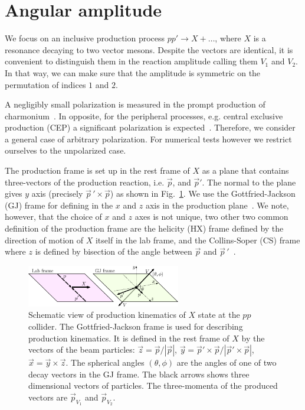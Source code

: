 \documentclass[prd,preprintnumbers,floatfix,
nofootinbib,superscriptaddress]{revtex4}
\begin{document}
\section{Angular amplitude} \label{sec:reaction.amplitude}
We focus on an inclusive production process $p p'\to X + \dots$, where $X$ is a resonance decaying to two vector mesons.
Despite the vectors are identical, it is convenient to distinguish them in the reaction amplitude calling them $V_1$ and $V_2$.
In that way, we can make sure that the amplitude is symmetric on the permutation of indices $1$ and $2$.

A negligibly small polarization is measured in the prompt production of charmonium~\cite{Aaij:2013nlm,Chatrchyan:2012woa,CDF:2011ag, Aaij:2013oxa,Sirunyan:2018bfd}.
In opposite, for the peripheral processes, e.g. central exclusive production (CEP) a significant polarization is expected~\cite{Pasechnik:2010pq}.
Therefore, we consider a general case of arbitrary polarization. For numerical tests however we restrict ourselves to the unpolarized case.

The production frame is set up in the rest frame of $X$ as a plane that contains three-vectors of the
production reaction, i.e. $\vec p$, and $\vec p'$. The normal to the plane gives $y$ axis (precisely $\vec p\,'\times \vec p$) as shown in Fig.~\ref{fig:production}.
We use the Gottfried-Jackson (GJ) frame for defining in the $x$ and $z$ axis in the production plane~\cite{Gottfried:1964nx}.
We note, however, that the choice of $x$ and $z$ axes is not unique, two other two common definition of the production frame are the helicity (HX) frame
defined by the direction of motion of $X$ itself in the lab frame, and the Collins-Soper (CS) frame where $z$ is defined by bisection of the angle between $\vec p$ and $\vec p\,'$~\cite{Faccioli:2010kd}.
\begin{figure}
  \includegraphics[width=0.6\textwidth]{../plots/production_GJ.pdf}
  \caption{Schematic view of production kinematics of $X$ state at the $pp$ collider.
  The Gottfried-Jackson frame is used for describing production kinematics.
  It is defined in the rest frame of $X$ by the vectors of the beam particles:
  $\vec z = \vec p / |\vec p|$, $\vec y = \vec p' \times \vec p / |\vec p' \times \vec p|$, $\vec x = \vec y \times \vec z$.
  The spherical angles $(\theta,\phi)$ are the angles of one of two decay vectors in the GJ frame.
  The black arrows shows three dimensional vectors of particles.
  The three-momenta of the produced vectors are $\vec p_{V_1}$ and $\vec p_{V_2}$.
  }
  \label{fig:production}
\end{figure}
\end{document}
